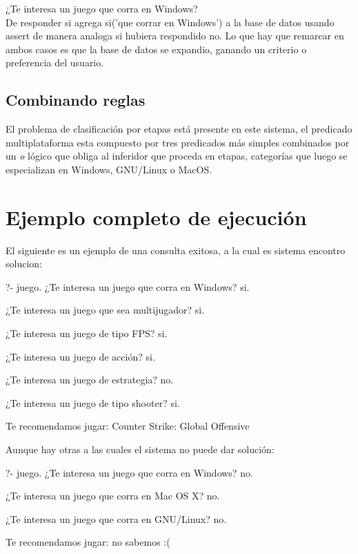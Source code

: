 \documentclass[11pt,oneside,a4paper]{article}
\begin{document}
¿Te interesa un juego que corra en Windows?\\

De responder si agrega si('que corrar en Windows') a la base de datos usando 
assert de manera analoga si hubiera respondido no. Lo que hay que remarcar en ambos casos 
es que la base de datos se expandio, ganando un criterio o preferencia del usuario.

\subsection{Combinando reglas} %

El problema de clasificación por etapas está presente en este sistema, el predicado 
multiplataforma esta compuesto por tres predicados más simples
combinados por un \emph{o} lógico que obliga al inferidor que proceda en etapas, 
categorías que luego se especializan en Windows, GNU/Linux o MacOS. 


\newpage
\section{Ejemplo completo de ejecución}

El siguiente es un ejemplo de una consulta exitosa, a la cual es sistema encontro
solucion:

?- juego.
¿Te interesa un juego que corra en Windows? si.

¿Te interesa un juego que sea multijugador? si.

¿Te interesa un juego de tipo FPS? si.

¿Te interesa un juego de acción? si.

¿Te interesa un juego de estrategia? no.

¿Te interesa un juego de tipo shooter? si.

Te recomendamos jugar: Counter Strike: Global Offensive

Aunque hay otras a las cuales el sistema no puede dar solución:

?- juego.
¿Te interesa un juego que corra en Windows? no.

¿Te interesa un juego que corra en Mac OS X? no.

¿Te interesa un juego que corra en GNU/Linux? no.

Te recomendamos jugar: no sabemos :(
\end{document}
